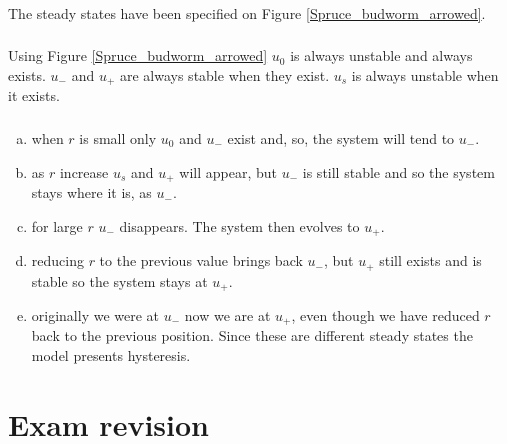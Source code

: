 \documentclass[]{article}
\newcommand{\fig}[1]{Figure \ref{#1}}
\begin{document}
\begin{Answ}
\subsubsection{}
The steady states have been specified on \fig{Spruce_budworm_arrowed}.
\subsubsection{}
Using \fig{Spruce_budworm_arrowed} $u_0$ is always unstable and always exists. $u_-$ and $u_+$ are always stable when they exist. $u_s$ is always unstable when it exists.
\subsubsection{}
\begin{enumerate}[(a)]
\item when $r$ is small only $u_0$ and $u_-$ exist and, so, the system will tend to $u_-$.
\item as $r$ increase $u_s$ and $u_+$ will appear, but $u_-$ is still stable and so the system stays where it is, as $u_-$.
\item for large $r$ $u_-$ disappears. The system then evolves to $u_+$.
\item reducing $r$ to the previous value brings back $u_-$, but $u_+$ still exists and is stable so the system stays at $u_+$.
\item originally we were at $u_-$ now we are at $u_+$, even though we have reduced $r$ back to the previous position. Since these are different steady states the model presents hysteresis.
\end{enumerate} 
\end{Answ}

\section*{Exam revision}
\end{document}

